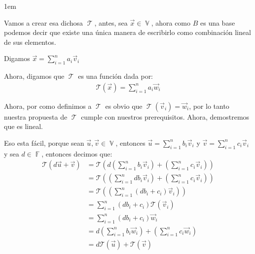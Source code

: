 \documentclass[12pt, fleqn]{report}                             %
\newenvironment{SmallIndentation}[1][0.75em]                    %
        {\begin{adjustwidth}{#1}{}\begin{footnotesize}}             %
        {\end{footnotesize}\end{adjustwidth}}                       %
\theoremstyle{break}                                            %
\DeclareMathOperator \GenericField {\mathbb{F}}                 %
\DeclareMathOperator \VectorSet    {\mathbb{V}}                 %
\DeclareMathOperator \LinTrans      {\mathcal{T}}               %
\newcommand{\Wrap}[1]           {\left( #1 \right)}             %
\newcommand{\FnLinTrans}[1]{\mathcal{T}\Wrap{#1}}               %
\begin{document}
\begin{itemize}
\begin{SmallIndentation}[1em]
                            Vamos a crear esa dichosa $\LinTrans$, antes, sea $\vec x \in \VectorSet$, ahora
                            como $B$ es una base podemos decir que existe una única manera de escribirlo
                            como combinación lineal de sus elementos. 

                            Digamos $\displaystyle \vec x = \sum_{i=1}^n a_i \vec v_i$

                            Ahora, digamos que $\LinTrans$ es una función dada por:
                            \begin{align*}
                                \FnLinTrans{\vec x} = \sum_{i=1}^n a_i \vec w_i
                            \end{align*}
                            
                            Ahora, por como definimos a $\LinTrans$ es obvio que $\LinTrans(\vec v_i) = \vec w_i$, por
                            lo tanto nuestra propuesta de $\LinTrans$ cumple con nuestros prerequisitos.
                            Ahora, demostremos que es lineal.

                            Eso esta fácil, porque sean $\vec u, \vec v \in \VectorSet$, entonces
                            $\vec u = \sum_{i=1}^n b_i \vec v_i$ y $\vec v = \sum_{i=1}^n c_i \vec v_i$
                            y sea $d \in \GenericField$, entonces decimos que:
                            \begin{align*}
                                \FnLinTrans{d \vec u + \vec v}
                                    &= \FnLinTrans{d \Wrap{\sum_{i=1}^n b_i \vec v_i} + \Wrap{\sum_{i=1}^n c_i \vec v_i}}   \\ 
                                    &= \FnLinTrans{\Wrap{\sum_{i=1}^n db_i \vec v_i} + \Wrap{\sum_{i=1}^n c_i \vec v_i}}    \\ 
                                    &= \FnLinTrans{\Wrap{\sum_{i=1}^n (db_i + c_i) \vec v_i}}                               \\ 
                                    &= \sum_{i=1}^n (db_i + c_i) \FnLinTrans{\vec v_i}                                      \\ 
                                    &= \sum_{i=1}^n (db_i + c_i) \vec w_i                                                   \\ 
                                    &= d\Wrap{\sum_{i=1}^n b_i \vec w_i} + \Wrap{\sum_{i=1}^n c_i \vec w_i}                 \\ 
                                    &= d\FnLinTrans{\vec u} + \FnLinTrans{\vec v}    
                            \end{align*}


\end{SmallIndentation}
\end{itemize}
\end{document}
